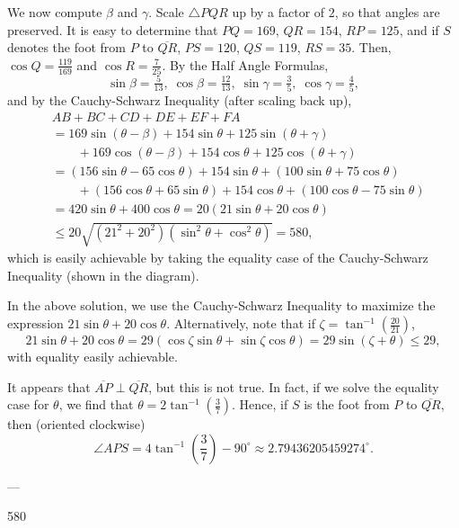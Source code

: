 We now compute $\beta$ and $\gamma$. Scale $\triangle PQR$ up by a factor of $2$, so that angles are preserved. It is easy to determine that $PQ=169$, $QR=154$, $RP=125$, and if $S$ denotes the foot from $P$ to $\overline{QR}$, $PS=120$, $QS=119$, $RS=35$. Then, $\cos Q=\tfrac{119}{169}$ and $\cos R=\tfrac7{25}$. By the Half Angle Formulas, \[\sin\beta=\tfrac5{13},\;\cos\beta=\tfrac{12}{13},\;\sin\gamma=\tfrac35,\;\cos\gamma=\tfrac45,\]
and by the Cauchy-Schwarz Inequality (after scaling back up),
\begin{align*}
    &AB+BC+CD+DE+EF+FA\\
    &=169\sin(\theta-\beta)+154\sin\theta+125\sin(\theta+\gamma)\\
    &\qquad+169\cos(\theta-\beta)+154\cos\theta+125\cos(\theta+\gamma)\\
    &=(156\sin\theta-65\cos\theta)+154\sin\theta+(100\sin\theta+75\cos\theta)\\
    &\qquad+(156\cos\theta+65\sin\theta)+154\cos\theta+(100\cos\theta-75\sin\theta)\\
    &=420\sin\theta+400\cos\theta=20(21\sin\theta+20\cos\theta)\\
    &\le 20\sqrt{(21^2+20^2)(\sin^2\theta+\cos^2\theta)}=580,
\end{align*}
which is easily achievable by taking the equality case of the Cauchy-Schwarz Inequality (shown in the diagram).
\begin{remark}
    In the above solution, we use the Cauchy-Schwarz Inequality to maximize the expression $21\sin\theta+20\cos\theta$. Alternatively, note that if $\zeta=\tan^{-1}(\tfrac{20}{21})$, \[21\sin\theta+20\cos\theta=29(\cos\zeta\sin\theta+\sin\zeta\cos\theta)=29\sin(\zeta+\theta)\le 29,\]
    with equality easily achievable.
\end{remark}
\begin{remark}
    It appears that $\overline{AP}\perp\overline{QR}$, but this is not true. In fact, if we solve the equality case for $\theta$, we find that $\theta=2\tan^{-1}(\tfrac37)$. Hence, if $S$ is the foot from $P$ to $\overline{QR}$, then (oriented clockwise) \[\angle APS=4\tan^{-1}\left(\frac37\right)-90^\circ\approx 2.79436205459274^\circ.\]
\end{remark}

---

580
